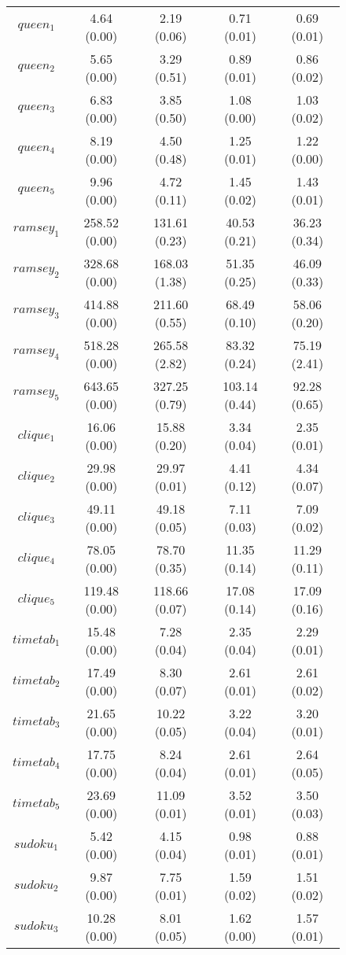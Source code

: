 \documentclass[preprint]{tlp}
\begin{document}
\begin{figure}[t!]
{\begin{tabular}{| c | c | c | c | c |}
$queen_1$ &  4.64 (0.00) & 2.19 (0.06) & 0.71 (0.01) & 0.69 (0.01) \\
$queen_2$ & 5.65 (0.00) & 3.29 (0.51) & 0.89 (0.01) & 0.86  (0.02) \\
$queen_3$ & 6.83 (0.00)  & 3.85 (0.50) & 1.08 (0.00) & 1.03 (0.02) \\
$queen_4$ & 8.19 (0.00) & 4.50 (0.48) & 1.25 (0.01) & 1.22 (0.00) \\
$queen_5$ & 9.96 (0.00) & 4.72 (0.11) & 1.45 (0.02) & 1.43 (0.01) \\
\cline{1-5}
$ramsey_1$ & 258.52 (0.00) & 131.61 (0.23) & 40.53 (0.21) & 36.23 (0.34)\\
$ramsey_2$ & 328.68 (0.00) & 168.03 (1.38) & 51.35 (0.25) & 46.09 (0.33)\\
$ramsey_3$ & 414.88 (0.00) & 211.60 (0.55) & 68.49 (0.10) & 58.06 (0.20)\\
$ramsey_4$ & 518.28 (0.00) & 265.58 (2.82) & 83.32 (0.24) & 75.19 (2.41)\\
$ramsey_5$ & 643.65 (0.00) & 327.25 (0.79) & 103.14 (0.44) & 92.28 (0.65)\\
\cline{1-5}
$clique_1$ & 16.06 (0.00) & 15.88 (0.20) & 3.34 (0.04) & 2.35 (0.01)\\
$clique_2$ & 29.98 (0.00) & 29.97 (0.01) & 4.41 (0.12) & 4.34 (0.07)\\
$clique_3$ & 49.11 (0.00) & 49.18 (0.05) & 7.11 (0.03) & 7.09 (0.02) \\
$clique_4$ & 78.05 (0.00) & 78.70 (0.35) & 11.35 (0.14) & 11.29 (0.11) \\
$clique_5$ & 119.48 (0.00) & 118.66 (0.07) & 17.08 (0.14) & 17.09 (0.16) \\
\cline{1-5}
$timetab_1$ & 15.48 (0.00) & 7.28 (0.04) & 2.35 (0.04) & 2.29 (0.01)\\
$timetab_2$ & 17.49 (0.00) & 8.30 (0.07) & 2.61 (0.01) & 2.61 (0.02)\\
$timetab_3$ & 21.65 (0.00) & 10.22 (0.05) & 3.22 (0.04) & 3.20 (0.01)\\
$timetab_4$ & 17.75 (0.00) & 8.24 (0.04) & 2.61 (0.01) & 2.64 (0.05)\\
$timetab_5$ & 23.69 (0.00) & 11.09 (0.01) & 3.52 (0.01) & 3.50 (0.03)\\
\cline{1-5}
$sudoku_1$ & 5.42 (0.00) & 4.15 (0.04) & 0.98 (0.01) & 0.88 (0.01)\\
$sudoku_2$ & 9.87 (0.00) & 7.75 (0.01) & 1.59 (0.02) & 1.51 (0.02)\\
$sudoku_3$ & 10.28 (0.00) & 8.01 (0.05) & 1.62 (0.00) & 1.57 (0.01)\\

\end{tabular}}
\end{figure}
\end{document}
